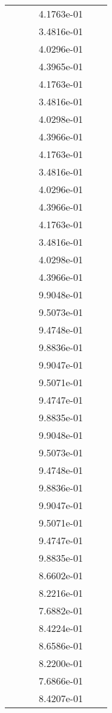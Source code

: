 \begin{xltabular}{\textwidth}{r|rS[table-format=1.3e+2]S[table-format=1.4e+2]S[table-format=1.4e+2]S[table-format=-1.5]}
&  &  & 4.1763e-01 & & \\
&  &  & 3.4816e-01 & & \\
&  &  & 4.0296e-01 & & \\
&  &  & 4.3965e-01 & & \\
&  &  & 4.1763e-01 & & \\
&  &  & 3.4816e-01 & & \\
&  &  & 4.0298e-01 & & \\
&  &  & 4.3966e-01 & & \\
&  &  & 4.1763e-01 & & \\
&  &  & 3.4816e-01 & & \\
&  &  & 4.0296e-01 & & \\
&  &  & 4.3966e-01 & & \\
&  &  & 4.1763e-01 & & \\
&  &  & 3.4816e-01 & & \\
&  &  & 4.0298e-01 & & \\
&  &  & 4.3966e-01 & & \\
&  &  & 9.9048e-01 & & \\
&  &  & 9.5073e-01 & & \\
&  &  & 9.4748e-01 & & \\
&  &  & 9.8836e-01 & & \\
&  &  & 9.9047e-01 & & \\
&  &  & 9.5071e-01 & & \\
&  &  & 9.4747e-01 & & \\
&  &  & 9.8835e-01 & & \\
&  &  & 9.9048e-01 & & \\
&  &  & 9.5073e-01 & & \\
&  &  & 9.4748e-01 & & \\
&  &  & 9.8836e-01 & & \\
&  &  & 9.9047e-01 & & \\
&  &  & 9.5071e-01 & & \\
&  &  & 9.4747e-01 & & \\
&  &  & 9.8835e-01 & & \\
&  &  & 8.6602e-01 & & \\
&  &  & 8.2216e-01 & & \\
&  &  & 7.6882e-01 & & \\
&  &  & 8.4224e-01 & & \\
&  &  & 8.6586e-01 & & \\
&  &  & 8.2200e-01 & & \\
&  &  & 7.6866e-01 & & \\
&  &  & 8.4207e-01 & & \\

\end{xltabular}
